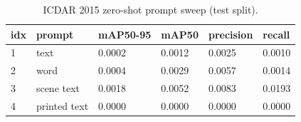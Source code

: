 \begin{table}[t]
\centering
\caption{ICDAR 2015 zero-shot prompt sweep (test split).}\label{tab:prompticdar}
\begin{tabular}{llllll}
\toprule
\textbf{idx} & \textbf{prompt} & \textbf{mAP50-95} & \textbf{mAP50} & \textbf{precision} & \textbf{recall} \\
\midrule
1 & text & 0.0002 & 0.0012 & 0.0025 & 0.0010 \\
2 & word & 0.0004 & 0.0029 & 0.0057 & 0.0014 \\
3 & scene text & 0.0018 & 0.0052 & 0.0083 & 0.0193 \\
4 & printed text & 0.0000 & 0.0000 & 0.0000 & 0.0000 \\
\bottomrule
\end{tabular}
\end{table}
